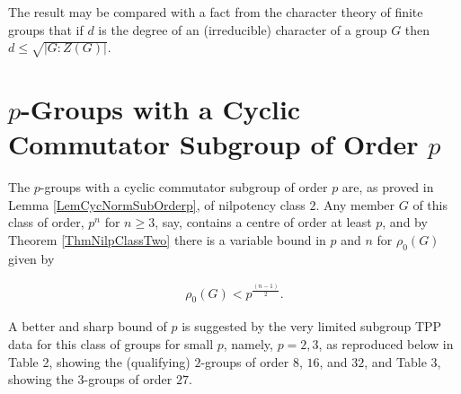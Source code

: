 \documentclass{amsart}
\theoremstyle{observation}
\theoremstyle{definition}
\theoremstyle{remark}
\numberwithin{equation}{section}
\begin{document}
The result may be compared with a fact from the character theory of finite groups that if $d$ is the degree of an (irreducible) character of a group $G$ then $d \leq \sqrt{|G:Z(G)|}$.

\section{$p$-Groups with a Cyclic Commutator Subgroup of Order $p$}\label{SecGroupsOfTypeII}

The $p$-groups with a cyclic commutator subgroup of order $p$ are, as proved in Lemma \ref{LemCycNormSubOrderp}, of nilpotency class $2$. Any member $G$ of this class of order, $p^n$ for $n \geq 3$, say, contains a centre of order at least $p$, and by Theorem \ref{ThmNilpClassTwo} there is a variable bound in $p$ and $n$ for $\rho_0(G)$ given by

\begin{align}\rho_0(G) < p^{\frac{(n - 1)}{2}}.
\end{align}

A better and sharp bound of $p$ is suggested by the very limited subgroup TPP data \citep[Tables 1 \& 2]{HM} for this class of groups for small $p$, namely, $p=2, 3$, as reproduced below in Table 2, showing the (qualifying) $2$-groups of order $8$, $16$, and $32$, and Table 3, showing the $3$-groups of order $27$.
\end{document}
